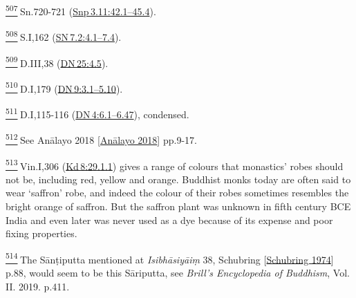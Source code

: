 \label{footprints_split_025.html_fn507}
\hyperref[footprints_split_013.htmlux5cux23fnref507]{\textsuperscript{507}} Sn.720-721
(\href{https://suttacentral.net/snp3.11/en/sujato\#42.1}{Snp\,3.11:42.1--45.4}).

\label{footprints_split_025.html_fn508}
\hyperref[footprints_split_013.htmlux5cux23fnref508]{\textsuperscript{508}} S.I,162
(\href{https://suttacentral.net/sn7.2/en/sujato\#4.1}{SN\,7.2:4.1--7.4}).

\label{footprints_split_025.html_fn509}
\hyperref[footprints_split_013.htmlux5cux23fnref509]{\textsuperscript{509}} D.III,38
(\href{https://suttacentral.net/dn25/en/sujato\#4.5}{DN\,25:4.5}).

\label{footprints_split_025.html_fn510}
\hyperref[footprints_split_013.htmlux5cux23fnref510]{\textsuperscript{510}} D.I,179
(\href{https://suttacentral.net/dn9/en/sujato\#3.1}{DN\,9:3.1--5.10}).

\label{footprints_split_025.html_fn511}
\hyperref[footprints_split_013.htmlux5cux23fnref511]{\textsuperscript{511}} D.I,115-116
(\href{https://suttacentral.net/dn4/en/sujato\#6.1}{DN\,4:6.1--6.47}),
condensed.

\label{footprints_split_025.html_fn512}
\hyperref[footprints_split_014.htmlux5cux23fnref512]{\textsuperscript{512}} See
{Anālayo 2018
{{[}\hyperref[footprints_split_022.htmlux5cux23Anux101layoux5cux25202018]{Anālayo
2018}{]}}} pp.9-17.

\label{footprints_split_025.html_fn513}
\hyperref[footprints_split_014.htmlux5cux23fnref513]{\textsuperscript{513}} Vin.I,306
(\href{https://suttacentral.net/pli-tv-kd8/en/brahmali\#29.1.1}{Kd\,8:29.1.1})
gives a range of colours that monastics' robes should not be, including
red, yellow and orange. Buddhist monks today are often said to wear
`saffron' robe, and indeed the colour of their robes sometimes resembles
the bright orange of saffron. But the saffron plant was unknown in fifth
century BCE India and even later was never used as a dye because of its
expense and poor fixing properties.

\label{footprints_split_025.html_fn514}
\hyperref[footprints_split_014.htmlux5cux23fnref514]{\textsuperscript{514}} The
Sānṭiputta mentioned at \emph{Isibhāsiyāiṃ} 38, {Schubring
{{[}\hyperref[footprints_split_022.htmlux5cux23Schubringux5cux25201974]{Schubring
1974}{]}}} p.88, would seem to be this Sāriputta, see \emph{Brill's
Encyclopedia of Buddhism}, Vol. II. 2019. p.411.

